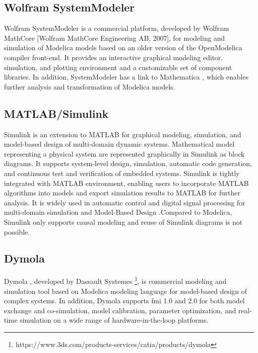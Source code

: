 \subsection{Wolfram SystemModeler}
\label{sec:wolfram}

Wolfram SystemModeler \cite{wolfram, wolframmats, wolframpeter} is a commercial platform, developed by Wolfram MathCore [Wolfram MathCore Engineering AB, 2007], for modeling and simulation of Modelica models based on an older version of the OpenModelica compiler front-end. It provides an interactive graphical modeling editor, simulation, and plotting environment and a customizable set of component libraries. In addition, SystemModeler has a link to Mathematica \cite{mathematica}, which enables further analysis and transformation of Modelica models.

\subsection{MATLAB/Simulink}
\label{sec:simulink}

Simulink \cite{simulink} is an extension to MATLAB for graphical modeling, simulation, and model-based design of multi-domain dynamic systems. Mathematical model representing a physical system are represented graphically in Simulink as block diagrams. It supports system-level design, simulation, automatic code generation, and continuous test and verification of embedded systems.
Simulink is tightly integrated with MATLAB environment, enabling users to incorporate MATLAB algorithms into models and export simulation results to MATLAB for further analysis. It is widely used in automatic control and digital signal processing for multi-domain simulation and Model-Based Design \cite{simulinkchristian,simulinkreedy}.Compared to Modelica, Simulink only supports causal modeling and reuse of Simulink diagrams is not possible.


\subsection{Dymola}
\label{sec:dymola}

Dymola \cite{dymola,dymoladag}, developed by Dassault Systemes \footnote{https://www.3ds.com/products-services/catia/products/dymola}, is commercial modeling and simulation tool based on Modelica modeling language for model-based design of complex systems. In addition, Dymola supports \acrshort{fmi} 1.0 and 2.0 for both model exchange and co-simulation, model calibration, parameter optimization, and real-time simulation on a wide range of hardware-in-the-loop platforms.

